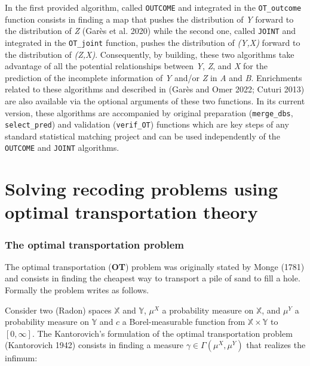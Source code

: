 In  the first provided algorithm, called \texttt{OUTCOME} and integrated in the \texttt{OT\_outcome} function consists in finding a map that pushes the distribution of \emph{Y} forward to the distribution of \emph{Z} (Garès et al. 2020) while the second one, called \texttt{JOINT} and integrated in the \texttt{OT\_joint} function, pushes the distribution of \emph{(Y,X)} forward to the distribution of \emph{(Z,X)}. Consequently, by building, these two algorithms take advantage of all the potential relationships between \emph{Y}, \emph{Z}, and \emph{X} for the prediction of the incomplete information of \emph{Y} and/or \emph{Z} in \emph{A} and \emph{B}. Enrichments related to these algorithms and described in (Garès and Omer 2022; Cuturi 2013) are also available via the optional arguments of these two functions. In its current version, these algorithms are accompanied by original preparation (\texttt{merge\_dbs}, \texttt{select\_pred}) and validation (\texttt{verif\_OT}) functions which are key steps of any standard statistical matching project and can be used independently of the \texttt{OUTCOME} and \texttt{JOINT} algorithms.

\hypertarget{solving-recoding-problems-using-optimal-transportation-theory}{%
\section{Solving recoding problems using optimal transportation theory}\label{solving-recoding-problems-using-optimal-transportation-theory}}

\hypertarget{the-optimal-transportation-problem}{%
\subsubsection{The optimal transportation problem}\label{the-optimal-transportation-problem}}

The optimal transportation (\textbf{OT}) problem was originally stated by Monge (1781) and consists in finding the cheapest way to transport a pile of sand to fill a hole. Formally the problem writes as follows.

Consider two (Radon) spaces \(\mathbb{X}\) and \(\mathbb{Y}\), \(\mu^X\) a probability measure on \(\mathbb{X}\), and \(\mu^Y\) a probability measure on \(\mathbb{Y}\) and \(c\) a Borel-measurable function from \(\mathbb{X} \times \mathbb{Y}\) to \(\left[0,\infty\right]\). The Kantorovich's formulation of the optimal transportation problem (Kantorovich 1942) consists in finding a measure \(\gamma \in \Gamma(\mu^X,\mu^Y)\) that realizes the infimum:

